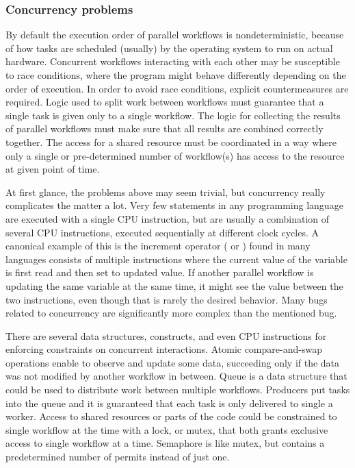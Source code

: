 \subsubsection{Concurrency problems}
By default the execution order of parallel workflows is nondeterministic, because of how tasks are scheduled (usually) by the operating system to run on actual hardware. Concurrent workflows interacting with each other may be susceptible to race conditions, where the program might behave differently depending on the order of execution. In order to avoid race conditions, explicit countermeasures are required. Logic used to split work between workflows must guarantee that a single task is given only to a single workflow. The logic for collecting the results of parallel workflows must make sure that all results are combined correctly together. The access for a shared resource must be coordinated in a way where only a single or pre-determined number of workflow(s) has access to the resource at given point of time.

At first glance, the problems above may seem trivial, but concurrency really complicates the matter a lot. Very few statements in any programming language are executed with a single CPU instruction, but are usually a combination of several CPU instructions, executed sequentially at different clock cycles. A canonical example of this is the increment operator (\inlinecode{++} or \inlinecode{+=}) found in many languages consists of multiple instructions where the current value of the variable is first read and then set to updated value. If another parallel workflow is updating the same variable at the same time, it might see the value between the two instructions, even though that is rarely the desired behavior. Many bugs related to concurrency are significantly more complex than the mentioned bug.

There are several data structures, constructs, and even CPU instructions for enforcing constraints on concurrent interactions. Atomic compare-and-swap operations enable to observe and update some data, succeeding only if the data was not modified by another workflow in between. Queue is a data structure that could be used to distribute work between multiple workflows. Producers put tasks into the queue and it is guaranteed that each task is only delivered to single a worker. Access to shared resources or parts of the code could be constrained to single workflow at the time with a lock, or mutex, that both grants exclusive access to single workflow at a time. Semaphore is like mutex, but contains a predetermined number of permits instead of just one.

